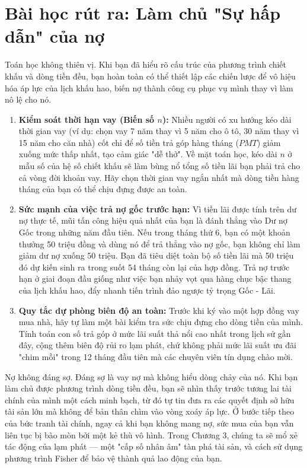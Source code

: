 \documentclass[14pt, a4paper, oneside]{extreport}
\begin{document}
\section{Bài học rút ra: Làm chủ "Sự hấp dẫn" của nợ}

Toán học không thiên vị. Khi bạn đã hiểu rõ cấu trúc của phương trình chiết khấu và dòng tiền đều, bạn hoàn toàn có thể thiết lập các chiến lược để vô hiệu hóa áp lực của lịch khấu hao, biến nợ thành công cụ phục vụ mình thay vì làm nô lệ cho nó.

\begin{enumerate}
    \item \textbf{Kiểm soát thời hạn vay (Biến số $n$):} 
    Nhiều người có xu hướng kéo dài thời gian vay (ví dụ: chọn vay 7 năm thay vì 5 năm cho ô tô, 30 năm thay vì 15 năm cho căn nhà) cốt chỉ để số tiền trả góp hàng tháng ($PMT$) giảm xuống mức thấp nhất, tạo cảm giác "dễ thở". Về mặt toán học, kéo dài $n$ ở mẫu số của hệ số chiết khấu sẽ làm bùng nổ tổng số tiền lãi bạn phải trả cho cả vòng đời khoản vay. Hãy chọn thời gian vay ngắn nhất mà dòng tiền hàng tháng của bạn có thể chịu đựng được an toàn.
    
    \item \textbf{Sức mạnh của việc trả nợ gốc trước hạn:} 
    Vì tiền lãi được tính trên dư nợ thực tế, mũi tấn công hiệu quả nhất của bạn là đánh thẳng vào Dư nợ Gốc trong những năm đầu tiên. Nếu trong tháng thứ 6, bạn có một khoản thưởng 50 triệu đồng và dùng nó để trả thẳng vào nợ gốc, bạn không chỉ làm giảm dư nợ xuống 50 triệu. Bạn đã tiêu diệt toàn bộ số tiền lãi mà 50 triệu đó dự kiến sinh ra trong suốt 54 tháng còn lại của hợp đồng. Trả nợ trước hạn ở giai đoạn đầu giống như việc bạn nhảy vọt qua hàng chục bậc thang của lịch khấu hao, đẩy nhanh tiến trình đảo ngược tỷ trọng Gốc - Lãi. 
    
    \item \textbf{Quy tắc dự phòng biên độ an toàn:}
    Trước khi ký vào một hợp đồng vay mua nhà, hãy tự làm một bài kiểm tra sức chịu đựng cho dòng tiền của mình. Tính toán con số trả góp ở mức lãi suất thả nổi cao nhất trong lịch sử gần đây, cộng thêm biên độ rủi ro lạm phát, chứ không phải mức lãi suất ưu đãi "chim mồi" trong 12 tháng đầu tiên mà các chuyên viên tín dụng chào mời. 
\end{enumerate}

Nợ không đáng sợ. Đáng sợ là vay nợ mà không hiểu dòng chảy của nó. Khi bạn làm chủ được phương trình dòng tiền đều, bạn sẽ nhìn thấy trước tương lai tài chính của mình một cách minh bạch, từ đó tự tin đưa ra các quyết định sở hữu tài sản lớn mà không để bản thân chìm vào vòng xoáy áp lực. Ở bước tiếp theo của bức tranh tài chính, ngay cả khi bạn không mang nợ, sức mua của bạn vẫn liên tục bị bào mòn bởi một kẻ thù vô hình. Trong Chương 3, chúng ta sẽ mổ xẻ tác động của lạm phát --- một "cấp số nhân âm" tàn phá tài sản, và cách sử dụng phương trình Fisher để bảo vệ thành quả lao động của bạn.
\end{document}
